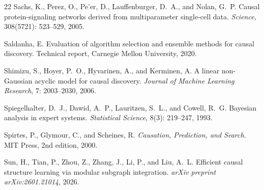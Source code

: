 \documentclass{article}
\begin{document}
\begin{thebibliography}{22}
Sachs, K., Perez, O., Pe'er, D., Lauffenburger, D.~A., and Nolan, G.~P.
\newblock Causal protein-signaling networks derived from multiparameter single-cell data.
\newblock \emph{Science}, 308(5721): 523--529, 2005.

Saldanha, E.
\newblock Evaluation of algorithm selection and ensemble methods for causal discovery.
\newblock Technical report, Carnegie Mellon University, 2020.

Shimizu, S., Hoyer, P.~O., Hyvarinen, A., and Kerminen, A.
\newblock A linear non-{G}aussian acyclic model for causal discovery.
\newblock \emph{Journal of Machine Learning Research}, 7: 2003--2030, 2006.

Spiegelhalter, D.~J., Dawid, A.~P., Lauritzen, S.~L., and Cowell, R.~G.
\newblock Bayesian analysis in expert systems.
\newblock \emph{Statistical Science}, 8(3): 219--247, 1993.

Spirtes, P., Glymour, C., and Scheines, R.
\newblock \emph{Causation, Prediction, and Search}.
\newblock MIT Press, 2nd edition, 2000.

Sun, H., Tian, P., Zhou, Z., Zhang, J., Li, P., and Liu, A.~L.
\newblock Efficient causal structure learning via modular subgraph integration.
\newblock \emph{arXiv preprint arXiv:2601.21014}, 2026.

\end{thebibliography}
\end{document}

